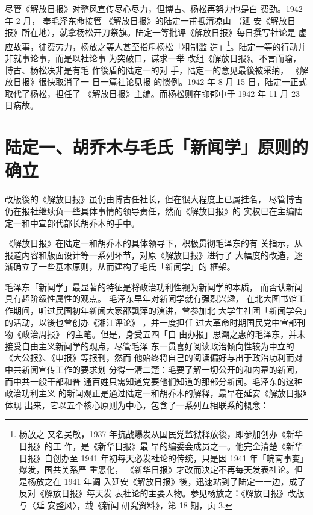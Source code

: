 尽管《解放日报》对整风宣传尽心尽力，但博古、杨松再努力也是白 费劲。1942
年 2 月， 奉毛泽东命接管 《解放日报》的陆定一甫抵清凉山 （延 安《解放日
报》所在地），就拿杨松开刀祭旗。陆定一等批评《解放日报》每日撰写社论是
虚应故事，徒费劳力，杨放之等人甚至指斥杨松「粗制滥 造」\footnote{杨放之
又名吴敏，1937 年抗战爆发从国民党监狱释放後，即参加创办《新华日报》的工
作，是《新华日报》最 早的编委会成员之一。他完全清楚《新华日报》自创办至
1941 年初每天必发社论的传统，只是因 1941 年「皖南事变」爆发，国共关系严
重恶化， 《新华日报》才改而决定不再每天发表社论。但是杨放之在 1941 年调
入延安《解放日报》後，迅速站到了陆定一一边，成了反对《解放日报》每天发
表社论的主要人物。参见杨放之：《解放日报》改版与〈延 安整风〉，载《新闻
研究资料》，第 18 期，页 3. }。陆定一等的行动并非就事论事，而是以社论事
为突破口，谋求一举 改组《解放日报》。不言而喻，博古、杨松决非是有毛
作後盾的陆定一的对 手，陆定一的意见最後被采纳， 《解放日报》很快取消了一
日一篇社论见报 的惯例。1942 年 8 月 15 日，陆定一正式取代了杨松，担任了
《解放日报》主编。而杨松则在抑郁中于 1942 年 11 月 23 日病故。



\section{陆定一、胡乔木与毛氏「新闻学」原则的确立}
改版後的《解放日报》虽仍由博古任社长，但在很大程度上已属挂名，
尽管博古仍在报社继续负一些具体事情的领导责任，然而《解放日报》的
实权已在主编陆定一和中宣部代部长胡乔木的手中。

《解放日报》在陆定一和胡乔木的具体领导下，积极贯彻毛泽东的有
关指示，从报道内容和版面设计等一系列环节，对原《解放日报》进行了
大幅度的改造，逐渐确立了一些基本原则，从而建构了毛氏「新闻学」的
框架。

毛泽东「新闻学」最显著的特征是将政治功利性视为新闻学的本质，
而否认新闻具有超阶级性属性的观点。
毛泽东早年对新闻学就有强烈兴趣，
在北大图书馆工作期间，听过民国初年新闻大家邵飘萍的演讲，曾参加北
大学生社团「新闻学会」的活动，以後也曾创办《湘江评论》
，并一度担任
过大革命时期国民党中宣部刊物《政治周报》
的主笔。但是，身受五四「自
由办报」思潮之惠的毛泽东，并未接受自由主义新闻学的观点，尽管毛泽
东一贯喜好阅读政治倾向性较为中立的《大公报》、《申报》等报刊，然而
他始终将自己的阅读偏好与出于政治功利而对中共新闻宣传工作的要求划
分得一清二楚：毛要了解一切公开的和内幕的新闻，而中共一般干部和普
通百姓只需知道党要他们知道的那部分新闻。毛泽东的这种政治功利主义
的新闻观正是通过陆定一和胡乔木的解释，最早在延安《解放日报》体现
出来，它以五个核心原则为中心，包含了一系列互相联系的概念：

